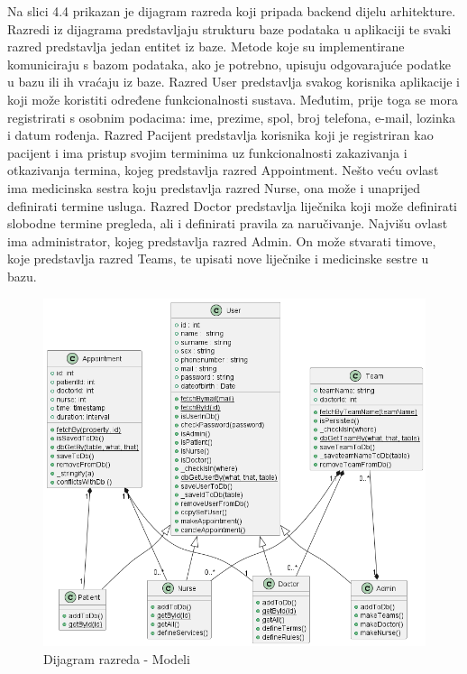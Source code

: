 			Na slici 4.4 prikazan je dijagram razreda koji pripada backend dijelu arhitekture. Razredi iz dijagrama predstavljaju strukturu baze podataka u aplikaciji te svaki razred predstavlja jedan entitet iz baze. Metode koje su implementirane komuniciraju s bazom podataka, ako je potrebno, upisuju odgovarajuće podatke u bazu ili ih vraćaju iz baze. Razred User predstavlja svakog korisnika aplikacije i koji može koristiti određene funkcionalnosti sustava. Međutim, prije toga se mora registrirati s osobnim podacima: ime, prezime, spol, broj telefona, e-mail, lozinka i datum rođenja. Razred Pacijent predstavlja korisnika koji je registriran kao pacijent i ima pristup svojim terminima uz funkcionalnosti zakazivanja i otkazivanja termina, kojeg predstavlja razred Appointment. Nešto veću ovlast ima medicinska sestra koju predstavlja razred Nurse, ona može i unaprijed definirati termine usluga. Razred Doctor predstavlja liječnika koji može definirati slobodne termine pregleda, ali i definirati pravila za naručivanje. Najvišu ovlast ima administrator, kojeg predstavlja razred Admin. On može stvarati timove, koje predstavlja razred Teams, te upisati nove liječnike i medicinske sestre u bazu.
			
			\begin{figure}[H]
			            \includegraphics[width=\textwidth]{slike/backend_class_diagram.png} %
			            \caption{Dijagram razreda - Modeli}
			            \label{fig:class1} %
		      \end{figure}
		      
